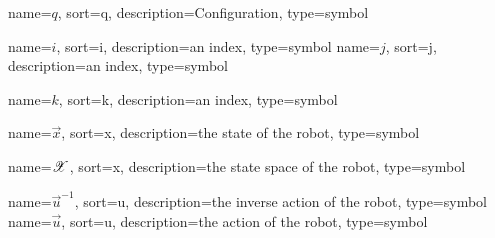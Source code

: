 	{%
		name=\ensuremath{q},
		sort=q,
		description=Configuration,
		type=symbol
	}
	\newcommand{\configuration}{\gls{sym:configuration}}

	{%
		name=\ensuremath{i},
		sort=i,
		description=an index,
		type=symbol
	}
	\newcommand{\indexi}{\gls{sym:indexi}}
	{%
		name=\ensuremath{j},
		sort=j,
		description=an index,
		type=symbol
	}
	\newcommand{\indexj}{\gls{sym:indexj}}

	{%
		name=\ensuremath{k},
		sort=k,
		description=an index,
		type=symbol
	}
	\newcommand{\indexk}{\gls{sym:indexk}}

	{%
		name=\ensuremath{\vec{x}},
		sort=x,
		description=the state  of the robot,
		type=symbol
	}
	\newcommand{\state}{\gls{sym:state}}

	{%
		name=\ensuremath{\vecspace{X}},
		sort=x,
		description=the state space of the robot,
		type=symbol
	}
	\newcommand{\statespace}{\gls{sym:statespace}}

	{%
		name=\ensuremath{\vec{u}^{-1}},
		sort=u,
		description=the inverse action  of the robot,
		type=symbol
	}
	\newcommand{\invaction}{\gls{sym:invaction}}
	{%
		name=\ensuremath{\vec{u}},
		sort=u,
		description=the action  of the robot,
		type=symbol
	}
	\newcommand{\action}{\gls{sym:action}}

